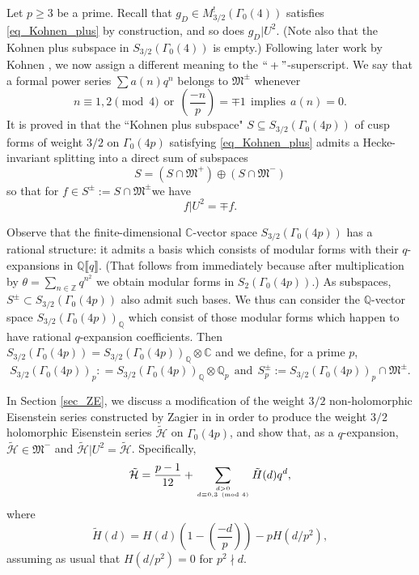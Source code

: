 \documentclass[11pt,letterpaper]{amsart}
\newcommand{\Z}{{\mathbb Z}}
\newcommand{\Q}{{\mathbb Q}}
\newcommand{\C}{{\mathbb C}}
\newcommand{\cH}{{\mathcal H}}
\newcommand{\gM}{{\mathfrak M}}
\theoremstyle{remark}
\newcommand{\itop}[2]{\genfrac {}{}{0pt}{3}{#1}{#2} }
\begin{document}
Let $p \geq 3$ be a prime. 
Recall that $g_D \in M^!_{3/2}(\Gamma_0(4))$ satisfies \eqref{eq_Kohnen_plus} by construction, and 
so does $g_D|U^2$.  
(Note also that the Kohnen plus subspace  in $S_{3/2}(\Gamma_0(4))$ is empty.)
Following later work by Kohnen \cite{Kohnen}, we now assign a different meaning to the  $``+"$-superscript. 
We say that a formal power series $\sum a(n)q^n$ belongs to $\gM^\pm$ whenever 
\[
n \equiv 1,2 \pmod {4} ~~ \text{or} ~~ \left(\frac{-n}{p} \right)= \mp1 ~~ \text{implies} ~~ a(n)=0.
\]
It is proved in   \cite{Kohnen} that the ``Kohnen plus subspace" $S \subseteq S_{3/2}(\Gamma_0(4p))$ of cusp forms  of weight $3/2$ on $\Gamma_0(4p)$ satisfying \eqref{eq_Kohnen_plus}  admits a Hecke-invariant splitting into a direct sum of subspaces
\[
S = \left( S \cap \gM^+ \right) \oplus  \left( S \cap \gM^- \right) 
\] 
so that for $f \in  S^\pm :=S \cap \gM^\pm  $we have
\[
f |U^2 = \mp f.
\]

Observe that the finite-dimensional $\C$-vector space $S_{3/2}(\Gamma_0(4p))$ has a rational structure: it admits a basis which consists of modular forms with their $q$-expansions in 
$\Q \llbracket q \rrbracket$. (That follows from \cite[Theorem 3.52]{Shimura} immediately because after multiplication by $\theta=\sum_{n \in \Z} q^{n^2}$ we obtain modular forms in $S_2(\Gamma_0(4p))$.) 
As subspaces, $S^\pm \subset S_{3/2}(\Gamma_0(4p))$ also admit such bases.
We thus can consider the $\Q$-vector space $S_{3/2}(\Gamma_0(4p))_\Q$ which consist of those modular forms which happen to have rational $q$-expansion coefficients. Then $S_{3/2}(\Gamma_0(4p)) = S_{3/2}(\Gamma_0(4p))_\Q \otimes \C$ and we define, for a prime $p$, 
\[
S_{3/2}(\Gamma_0(4p))_p: = S_{3/2}(\Gamma_0(4p))_\Q \otimes \Q_p ~~ \text{and} ~~ S^\pm_p := S_{3/2}(\Gamma_0(4p))_p \cap \gM^\pm.
\]

In Section \ref{sec_ZE}, we discuss a modification of the weight $3/2$ non-holomorphic Eisenstein series constructed by Zagier in \cite{Zagier_eis} in order to produce the weight $3/2$ holomorphic Eisenstein series $\tilde{\cH}$ on $\Gamma_0(4p)$, and show that, as a $q$-expansion, $\tilde{\cH} \in \gM^-$ and $\tilde{\cH}|U^2 = \tilde{\cH}$.
Specifically, 
\[
\tilde{\cH} = \frac{p-1}{12} + \sum_{\itop{d>0}{d \equiv 0,3 \pmod{4}}} \tilde{H}(d) q^d,
\]
where
\[
 \tilde{H}(d) = H(d)\left(1-  \left( \frac{-d}{p} \right)\right)- pH(d/p^2), 
\]
assuming as usual that $H(d/p^2) = 0$ for $p^2 \nmid d$.
\end{document}
